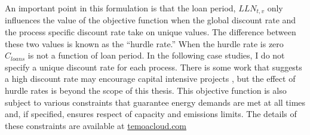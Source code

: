 An important point in this formulation is that the loan period, $LLN_{t,v}$ only
influences the value of the objective function when the global discount rate
and the process specific discount rate take on unique values. The difference between
these two values is known as the ``hurdle rate.'' When the hurdle rate is zero
$C_{loans}$ is not a function of loan period. In the following case studies, I
do not specify a unique discount rate for each process. There is some work that
suggests a high discount rate may encourage capital intensive projects \cite{alzbutas_uncertainty_2012,
decarolis_modelling_2016}, but the effect of hurdle rates is beyond the scope of
this thesis. This objective function is also subject to various constraints that
guarantee energy demands are met at all times and, if specified, ensures respect
of capacity and emissions limits. The details of these constraints are available
at \href{https://temoacloud.com/temoaproject/Documentation.html#the-math-behind-temoa}{temoacloud.com}

